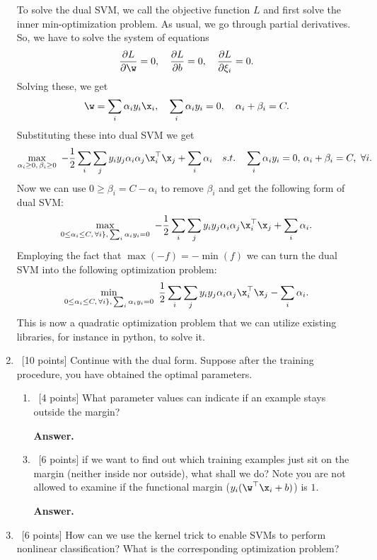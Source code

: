\documentclass[12pt, fullpage,letterpaper]{article}
\begin{document}
\begin{enumerate}
To solve the dual SVM, we call the objective function $L$ and first solve the inner min-optimization problem. As usual, we go through partial derivatives. So, we have to solve the system of equations 
$$\frac{\partial L}{\partial \w} =0, \quad \frac{\partial L}{\partial b} =0, \quad \frac{\partial L}{\partial \xi_i} =0.$$ 
Solving these, we get 
$$\w = \sum_i \alpha_i y_i \x_i, \quad \sum_i \alpha_i y_i = 0, \quad \alpha_i + \beta_i = C.$$
Substituting these into dual SVM we get 
$$\max_{\alpha_i \geq 0, \, \beta_i \geq 0} \  - \frac{1}{2} \sum_i \sum_j y_i y_j \alpha_i \alpha_j \x_i^\top \x_j + \sum_i \alpha_i \quad s.t. \quad \sum_i \alpha_i y_i = 0, \, \alpha_i + \beta_i = C, \ \forall i.$$
Now we can use $0 \geq \beta_i = C - \alpha_i$ to remove $\beta_i$ and get the following form of dual SVM:
$$\max_{0 \leq \alpha_i \leq C, \, \forall i\}, \, \sum_i \alpha_i y_i = 0} \  - \frac{1}{2} \sum_i \sum_j y_i y_j \alpha_i \alpha_j \x_i^\top \x_j + \sum_i \alpha_i.$$
Employing the fact that $\max(-f) = - \min(f)$ we can turn the dual SVM into the following optimization problem:
$$\min_{0 \leq \alpha_i \leq C, \, \forall i\}, \, \sum_i \alpha_i y_i = 0} \  \frac{1}{2} \sum_i \sum_j y_i y_j \alpha_i \alpha_j \x_i^\top \x_j - \sum_i \alpha_i.$$
This is now a quadratic optimization problem that we can utilize existing libraries, for instance in python, to solve it. 

	\item~[10 points] Continue with the dual form. Suppose after the training procedure, you have obtained the optimal parameters.
	\begin{enumerate}
	
		\item~[4 points] What parameter values can indicate if an example stays outside the margin?
		
\item[{\bf Answer.}]

		\item~[6 points]  if we want to find out which training examples just sit on the margin (neither inside nor outside), what shall we do? Note you are not allowed to examine if the functional margin (\ie $y_i(\w^\top\x_i +b)$) is $1$.
		
\item[{\bf Answer.}]

	\end{enumerate}
	
	
	\item~[6 points] How can we use the kernel trick to enable SVMs to perform nonlinear classification? What is the corresponding optimization problem?
	

\end{enumerate}
\end{document}
